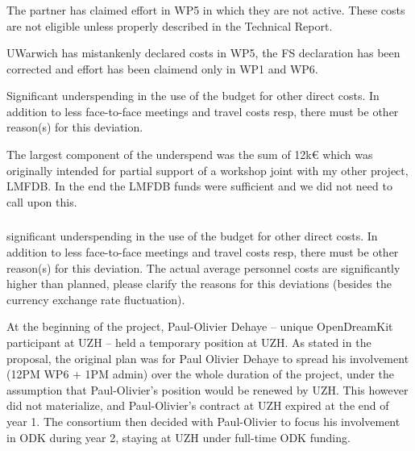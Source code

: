 
\subsubsection{}
\begin{EUcomment}
  The partner has claimed effort in WP5 in which they are not active.
  These costs are not eligible unless properly described in the
  Technical Report.
\end{EUcomment}
UWarwich has mistankenly declared costs in WP5, the FS declaration has been corrected and effort has been claimend only in WP1 and WP6. 

\begin{EUcomment}
  Significant underspending in the use of the budget for other direct
  costs. In addition to less face-to-face meetings and travel costs
  resp, there must be other reason(s) for this deviation.
\end{EUcomment}
The largest component of the underspend was the sum of 12k€ which was originally intended for partial support of a workshop joint with my other project, LMFDB.  In the end the LMFDB funds were sufficient and we did not need to call upon this.


\subsubsection{}
\begin{EUcomment}
  significant underspending in the use of the budget for other direct
  costs. In addition to less face-to-face meetings and travel costs
  resp, there must be other reason(s) for this deviation. The actual
  average personnel costs are significantly higher than planned,
  please clarify the reasons for this deviations (besides the currency
  exchange rate fluctuation).
\end{EUcomment}

At the beginning of the project, Paul-Olivier Dehaye -- unique
OpenDreamKit participant at UZH -- held a temporary position at UZH.
As stated in the proposal, the original plan was for Paul Olivier
Dehaye to spread his involvement (12PM WP6 + 1PM admin) over the whole
duration of the project, under the assumption that Paul-Olivier's
position would be renewed by UZH. This however did not materialize,
and Paul-Olivier's contract at UZH expired at the end of year 1. The
consortium then decided with Paul-Olivier to focus his involvement in
ODK during year 2, staying at UZH under full-time ODK funding.

